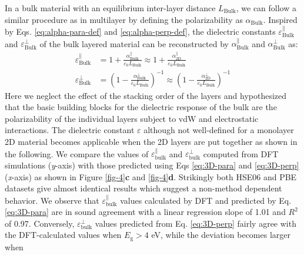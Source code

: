 \documentclass[journal=ancac3,manuscript=article,email=true,hyperref=true,keywords=false]{achemso}
\begin{document}
In a bulk material with an equilibrium
inter-layer distance $L_{\mathrm{Bulk}}$, we can follow a similar procedure as in multilayer by 
defining the polarizability as $\alpha_{\mathrm{Bulk}}$.  %
%
Inspired by Eqs. \ref{eq:alpha-para-def} and
\ref{eq:alpha-perp-def}, the dielectric constants
$\varepsilon^{\parallel}_{\mathrm{Bulk}}$ and
$\varepsilon^{\perp}_{\mathrm{Bulk}}$ of the bulk layered material can
be reconstructed by $\alpha_{\mathrm{Bulk}}^{\parallel}$ and
$\alpha_{\mathrm{Bulk}}^{\perp}$ as:
%
%
\begin{subequations}
\begin{align}
  \label{eq:3D-para}
  \varepsilon^{\parallel}_{\mathrm{Bulk}}
  &= 1 + \frac{\alpha_{\mathrm{Bulk}}^{\parallel}}{\varepsilon_{0} L_{\mathrm{Bulk}}}
  \approx 1 + \frac{\alpha_{\mathrm{2D}}^{\parallel}}{\varepsilon_{0} L_{\mathrm{Bulk}}} \\
  \label{eq:3D-perp}
  \varepsilon^{\perp}_{\mathrm{Bulk}}
  &= \left(1 - \frac{\alpha_{\mathrm{Bulk}}^{\perp}}{\varepsilon_{0} L_{\mathrm{Bulk}}}\right)^{-1}
  \approx \left(1 - \frac{\alpha_{\mathrm{2D}}^{\perp}}{\varepsilon_{0} L_{\mathrm{Bulk}}}\right)^{-1}
\end{align}
\end{subequations}
%
%
Here we neglect the effect of the stacking order of the layers and hypothesized 
that the basic building blocks for the dielectric response of the bulk are the polarizability of the 
individual layers subject to vdW and electrostatic interactions. 
The dielectric constant $\varepsilon$ although not well-defined for a
monolayer 2D material becomes applicable when the 2D layers are put
together as shown in the following. 
%
We compare the values of
$\varepsilon_{\mathrm{bulk}}^{\parallel}$ and
$\varepsilon_{\mathrm{bulk}}^{\perp}$ computed from DFT simulations (\textit{y}-axis)
with those predicted using Eqs \ref{eq:3D-para} and \ref{eq:3D-perp}
(\textit{x}-axis) as shown in Figure \ref{fig-4}{\textbf c} and \ref{fig-4}{\textbf d}. 
Strikingly both HSE06 and PBE datasets give almost identical results which suggest 
a non-method dependent behavior. 
%
We observe that
$\varepsilon_{\mathrm{bulk}}^{\parallel}$ values calculated by DFT and
predicted by Eq. \ref{eq:3D-para} are in sound agreement with a linear
regression slope of 1.01 and $R^2$ of 0.97. Conversely, 
$\varepsilon_{\mathrm{bulk}}^{\perp}$ values predicted from
Eq. \ref{eq:3D-perp} fairly agree with the DFT-calculated values when
$E_{\mathrm{g}}>4$ eV, while the deviation becomes larger when
\end{document}

